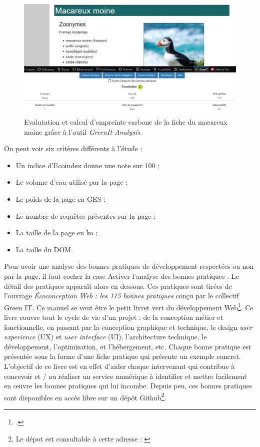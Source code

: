 \documentclass[a4paper,12pt,twoside]{book}
\begin{document}
\begin{figure}[H]
    \centering
    \includegraphics[width=\linewidth]{img/partie_3/greenit.JPG}
    \caption{Evalutation et calcul d'empreinte carbone de la fiche du macareux moine grâce à l'outil \textit{GreenIt-Analysis}.}
\end{figure}


On peut voir six critères différents à l'étude :
\begin{itemize}
    \item Un indice d'Ecoindex donne une note sur 100 ;
    \item Le volume d'eau utilisé par la page ;
    \item Le poids de la page en \acrlong{GES} ;
    \item Le nombre de requêtes présentes sur la page ;
    \item La taille de la page en ko ;
    \item La taille du \acrshort{DOM}.
\end{itemize}

Pour avoir une analyse des bonnes pratiques de développement respectées ou non par la page, il faut cocher la case \og Activer l'analyse des bonnes pratiques \fg. Le détail des pratiques apparaît alors en dessous. Ces pratiques sont tirées de l'ouvrage \og \textit{Écoconception Web : les 115 bonnes pratiques} \fg{} conçu par le collectif Green IT. Ce manuel se veut être le \og petit livret vert du développement Web\fg\footcite{greenit}. Ce livre couvre tout le cycle de vie d’un projet : de la conception métier et fonctionnelle, en passant par la conception graphique et technique, le design \textit{user experience} (UX) et \textit{user interface} (UI), l'architecture technique, le développement, l'optimisation, et l'hébergement, etc. Chaque bonne pratique est présentée sous la forme d'une fiche pratique qui présente un exemple concret. L'objectif de ce livre est en effet d'aider chaque intervenant qui contribue à concevoir et / ou réaliser un service numérique à identifier et mettre facilement en \oe{}uvre les bonnes pratiques qui lui incombe. Depuis peu, ces bonnes pratiques sont disponibles en accès libre sur un dépôt Github\footnote{Le dépot est consultable à cette adresse : \cite{bonnes-pratiques}}.
\end{document}
